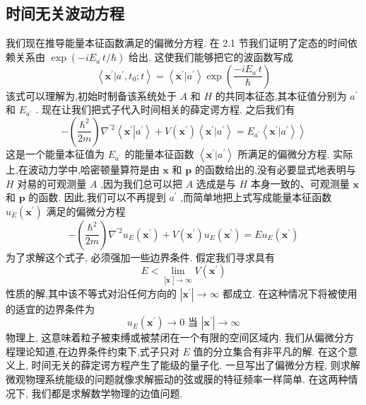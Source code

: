 \subsection{时间无关波动方程}
我们现在推导能量本征函数满足的偏微分方程. 在 2.1 节我们证明了定态的时间依赖关系由 $\exp \left( {-i{E}_{{a}^{\prime }}t/\hbar }\right)$ 给出. 这使我们能够把它的波函数写成
\begin{equation}
\left\langle {{\mathbf{x}}^{\prime } | {a}^{\prime },{t}_{0};t}\right\rangle = \left\langle {{\mathbf{x}}^{\prime } | {a}^{\prime }}\right\rangle \exp \left( \frac{-i{E}_{{a}^{\prime }}t}{\hbar }\right)
\end{equation}
该式可以理解为,初始时制备该系统处于 $A$ 和 $H$ 的共同本征态,其本征值分别为 ${a}^{\prime }$ 和 ${E}_{{a}^{\prime }}$ . 现在让我们把式子代入时间相关的薛定谔方程. 之后我们有
\begin{equation}
- \left( \frac{{\hbar }^{2}}{2m}\right) {\nabla }^{\prime 2}\left\langle {{\mathbf{x}}^{\prime }\left| {a}^{\prime }\right\rangle + V\left( {\mathbf{x}}^{\prime }\right) \left\langle {{\mathbf{x}}^{\prime } | {a}^{\prime }}\right\rangle = {E}_{{a}^{\prime }}\left\langle {{\mathbf{x}}^{\prime } | {a}^{\prime }}\right\rangle }\right\rangle
\end{equation}
这是一个能量本征值为 ${E}_{{a}^{\prime }}$ 的能量本征函数 $\left\langle {{\mathbf{x}}^{\prime } | {a}^{\prime }}\right\rangle$ 所满足的偏微分方程. 实际上,在波动力学中,哈密顿量算符是由 $\mathbf{x}$ 和 $\mathbf{p}$ 的函数给出的,没有必要显式地表明与 $H$ 对易的可观测量 $A$ ,因为我们总可以把 $A$ 选成是与 $H$ 本身一致的、可观测量 $\mathbf{x}$ 和 $\mathbf{p}$ 的函数. 因此,我们可以不再提到 ${a}^{\prime }$ ,而简单地把上式写成能量本征函数 ${u}_{E}\left( {\mathbf{x}}^{\prime }\right)$ 满足的偏微分方程
\begin{equation}
- \left( \frac{{\hbar }^{2}}{2m}\right) {\nabla }^{\prime 2}{u}_{E}\left( {\mathbf{x}}^{\prime }\right) + V\left( {\mathbf{x}}^{\prime }\right) {u}_{E}\left( {\mathbf{x}}^{\prime }\right) = E{u}_{E}\left( {\mathbf{x}}^{\prime }\right)
\end{equation}
为了求解这个式子, 必须强加一些边界条件. 假定我们寻求具有
\begin{equation}
E < \mathop{\lim }\limits_{{\left| {\mathbf{x}}^{\prime }\right| \rightarrow \infty }}V\left( {\mathbf{x}}^{\prime }\right)
\end{equation}
性质的解,其中该不等式对沿任何方向的 $\left| {\mathbf{x}}^{\prime }\right| \rightarrow \infty$ 都成立. 在这种情况下将被使用的适宜的边界条件为
\begin{equation}
{u}_{E}\left( {\mathbf{x}}^{\prime }\right) \rightarrow 0\text{ 当 }\left| {\mathbf{x}}^{\prime }\right| \rightarrow \infty
\end{equation}
物理上, 这意味着粒子被束缚或被禁闭在一个有限的空间区域内. 我们从偏微分方程理论知道,在边界条件约束下,式子只对 $E$ 值的分立集合有非平凡的解. 在这个意义上, 时间无关的薛定谔方程产生了能级的量子化. 一旦写出了偏微分方程, 则求解微观物理系统能级的问题就像求解振动的弦或膜的特征频率一样简单. 在这两种情况下, 我们都是求解数学物理的边值问题.

